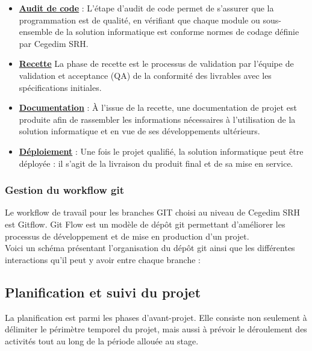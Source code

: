 \begin{itemize}
    \item \textbf{\underline{Audit de code}} : L'étape d'audit de code permet de s’assurer que la programmation est de qualité, en vérifiant que chaque module ou sous-ensemble de la solution informatique est conforme normes de codage définie par Cegedim SRH.
    \item \textbf{\underline{Recette}} La phase de recette est le processus de validation par l'équipe de validation et acceptance (QA) de la conformité des livrables avec les spécifications initiales.
    \item \textbf{\underline{Documentation}} : À l’issue de la recette, une documentation de projet est produite afin de rassembler les informations nécessaires à l’utilisation de la solution informatique et en vue de ses développements ultérieurs.
    \item \textbf{\underline{Déploiement}} : Une fois le projet qualifié, la solution informatique peut être déployée : il s’agit de la livraison du produit final et de sa mise en service.
\end{itemize}
\subsubsection{Gestion du workflow git}
Le workflow de travail pour les branches GIT choisi au niveau de Cegedim SRH est Gitflow. Git Flow est un modèle de dépôt git permettant d'améliorer les processus de développement et de mise en production d'un projet.\\
Voici un schéma présentant l'organisation du dépôt git ainsi que les différentes interactions qu'il peut y avoir entre chaque branche :
\subsection{Planification et suivi du projet}
La planification est parmi les phases d'avant-projet. Elle consiste non seulement à délimiter le périmètre temporel du projet, mais aussi à prévoir le déroulement des activités tout au long de la période allouée au stage.

